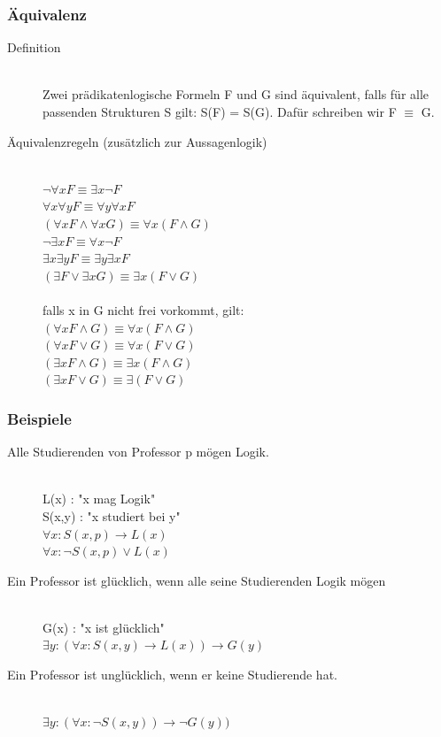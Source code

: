\documentclass[a4paper,10pt]{article}
\newcommand{\ra}{\rightarrow}
\begin{document}
\subsubsection{\"Aquivalenz}
\begin{description}
	\item[Definition] \hfill \\
		Zwei pr\"adikatenlogische Formeln F und G sind \"aquivalent, falls f\"ur alle passenden Strukturen S gilt: S(F) = S(G). Daf\"ur schreiben wir F $\equiv$ G.
	\item[\"Aquivalenzregeln (zus\"atzlich zur Aussagenlogik)] \hfill \\
		$\neg \forall x F \equiv \exists x \neg F$ \\
		$\forall x \forall y F \equiv \forall y \forall x F$ \\
		$(\forall x F \wedge \forall x G) \equiv \forall x (F \wedge G)$ \\
		$\neg \exists x F \equiv \forall x \neg F$ \\		
		$\exists x \exists y F \equiv \exists y \exists x F$ \\
		$(\exists F \vee \exists x G) \equiv \exists x (F \vee G)$ \\ \\
		falls x in G nicht frei vorkommt, gilt: \\
		$(\forall x F \wedge G) \equiv \forall x (F \wedge G)$ \\
		$(\forall x F \vee G) \equiv \forall x (F \vee G)$ \\
		$(\exists x F \wedge G) \equiv \exists x (F \wedge G)$ \\
		$(\exists x F \vee G) \equiv \exists (F \vee G)$ \\
\end{description}

\subsubsection{Beispiele}
\begin{description}
	\item[Alle Studierenden von Professor p m\"ogen Logik.] \hfill \\
		L(x) : "x mag Logik" \\
		S(x,y) : "x studiert bei y" \\
		$\forall x: S(x,p) \ra L(x)$ \\
		$\forall x: \neg S(x,p) \vee L(x)$
	\item[Ein Professor ist gl\"ucklich, wenn alle seine Studierenden Logik m\"ogen] \hfill \\
		G(x) : "x ist gl\"ucklich" \\
		$\exists y: (\forall x : S(x,y) \ra L(x)) \ra G(y)$
	\item[Ein Professor ist ungl\"ucklich, wenn er keine Studierende hat.] \hfill \\
		$\exists y: (\forall x : \neg S(x,y)) \ra \neg G(y))$
\end{description}
\end{document}
